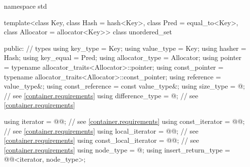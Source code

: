 %
\begin{codeblock}
namespace std {
  template<class Key,
           class Hash = hash<Key>,
           class Pred = equal_to<Key>,
           class Allocator = allocator<Key>>
  class unordered_set {
  public:
    // types
    using key_type             = Key;
    using value_type           = Key;
    using hasher               = Hash;
    using key_equal            = Pred;
    using allocator_type       = Allocator;
    using pointer              = typename allocator_traits<Allocator>::pointer;
    using const_pointer        = typename allocator_traits<Allocator>::const_pointer;
    using reference            = value_type&;
    using const_reference      = const value_type&;
    using size_type            = @\impdef@; // see \ref{container.requirements}
    using difference_type      = @\impdef@; // see \ref{container.requirements}

    using iterator             = @@; // see \ref{container.requirements}
    using const_iterator       = @@; // see \ref{container.requirements}
    using local_iterator       = @@; // see \ref{container.requirements}
    using const_local_iterator = @@; // see \ref{container.requirements}
    using node_type            = @\unspec@;
    using insert_return_type   = @@<iterator, node_type>;

}}
\end{codeblock}
